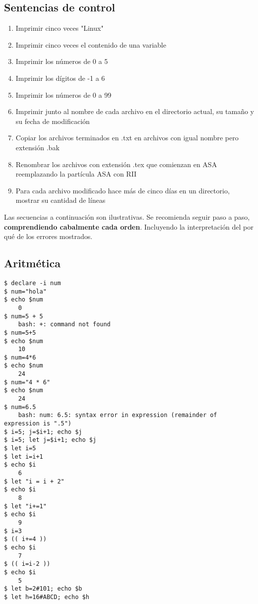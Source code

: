 \subsection{Sentencias de control}
\begin{enumerate}
	\item 
Imprimir cinco veces "Linux"
	\item 
Imprimir cinco veces el contenido de una variable
	\item 
Imprimir los números de 0 a 5
	\item 
Imprimir los dígitos de -1 a 6
	\item 
Imprimir los números de 0 a 99
	\item 
Imprimir junto al nombre de cada archivo en el directorio actual, su tamaño y su fecha de modificación
	\item 
Copiar los archivos terminados en .txt en archivos con igual nombre pero extensión .bak
	\item 
Renombrar los archivos con extensión .tex que comienzan en ASA reemplazando la partícula ASA con RII
	\item 
Para cada archivo modificado hace más de cinco días en un directorio, mostrar su cantidad de líneas
\end{enumerate}

Las secuencias a continuación son ilustrativas. Se recomienda seguir paso a paso, {\bf comprendiendo cabalmente cada orden}. Incluyendo la interpretación del por qué de los errores mostrados. 

\subsection{Aritmética}
\begin{lstlisting}
$ declare -i num
$ num="hola"
$ echo $num
	0
$ num=5 + 5
	bash: +: command not found
$ num=5+5
$ echo $num
	10
$ num=4*6
$ echo $num
	24
$ num="4 * 6"
$ echo $num
	24
$ num=6.5
	bash: num: 6.5: syntax error in expression (remainder of expression is ".5")
$ i=5; j=$i+1; echo $j
$ i=5; let j=$i+1; echo $j
$ let i=5
$ let i=i+1
$ echo $i
	6
$ let "i = i + 2"
$ echo $i
	8
$ let "i+=1"
$ echo $i
	9
$ i=3
$ (( i+=4 ))
$ echo $i
	7
$ (( i=i-2 ))
$ echo $i
	5
$ let b=2#101; echo $b
$ let h=16#ABCD; echo $h
\end{lstlisting}

